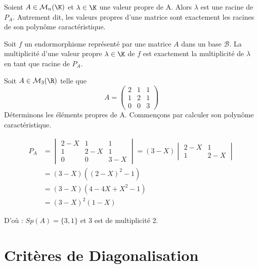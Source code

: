 \begin{prop}
    Soient $A \in \mathcal{M}_n(\K)$ et $\lambda \in \K$ une valeur propre de A. 
    Alors $\lambda$ est une racine de $P_A$. 
    Autrement dit, les valeurs propres d'une matrice sont exactement les racines de son polynôme caractéristique. 
\end{prop}

\begin{definition}[Multiplicité]
    Soit $f$ un endormorphisme représenté par une matrice $A$ dans un base $\mathcal{B}$. 
    La multiplicité d'une valeur propre $\lambda \in \K$ de $f$ est exactement la multiplicité de $\lambda$ en tant que racine de $P_A$.     
\end{definition}

\begin{example}
    Soit $A \in \mathcal{M}_3(\R)$ telle que 
    \[A = 
        \begin{pmatrix}
            2 & 1 & 1 \\ 
            1 & 2 & 1 \\ 
            0 & 0 & 3
        \end{pmatrix}
    \]
    Déterminons les éléments propres de A. Commençons par calculer son polynôme caractéristique. 

    \begin{align*}
        P_A &=  \begin{vmatrix}
                    2-X & 1 & 1 \\ 
                    1 & 2-X & 1 \\ 
                    0 & 0 & 3-X 
                \end{vmatrix}
            = (3-X)    \begin{vmatrix}
                            2-X & 1  \\ 
                            1 & 2-X
                        \end{vmatrix} \\ 
            &= (3-X)((2-X)^2-1) \\
            &= (3-X)(4 - 4X + X^2 - 1) \\
            &= (3-X)^2(1-X)
    \end{align*}

    D'où : $Sp(A) = \{3,1\}$ et 3 est de multiplicité 2. 
\end{example}


\section{Critères de Diagonalisation}


